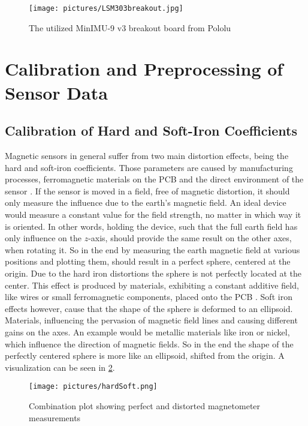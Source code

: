 \begin{figure}
\centering
\texttt{[image: pictures/LSM303breakout.jpg]}
\caption{The utilized MinIMU-9 v3 breakout board from Pololu \cite{pol2016}}
\label{fig:breakout}
\end{figure}


\section{Calibration and Preprocessing of Sensor Data} \label{sec:caliPrepro}

\subsection{Calibration of Hard and Soft-Iron Coefficients} \label{subsec:hardSoft}

Magnetic sensors in general suffer from two main distortion effects, being the hard and soft-iron coefficients. Those parameters are caused by manufacturing processes, ferromagnetic materials on the \ac{PCB} and the direct environment of the sensor \cite{ozyagcilar2012calibrating}. If the sensor is moved in a field, free of magnetic distortion, it should only measure the influence due to the earth's magnetic field. An ideal device would measure a constant value for the field strength, no matter in which way it is oriented. In other words, holding the device, such that the full earth field has only influence on the $ z $-axis, should provide the same result on the other axes, when rotating it. So in the end by measuring the earth magnetic field at various positions and plotting them, should result in a perfect sphere, centered at the origin. Due to the hard iron distortions the sphere is not perfectly located at the center. This effect is produced by materials, exhibiting a constant additive field, like wires or small ferromagnetic components, placed onto the PCB \cite{konv2009}. Soft iron effects however, cause that the shape of the sphere is deformed to an ellipsoid. Materials, influencing the pervasion of magnetic field lines and causing different gains on the axes. An example would be metallic materials like iron or nickel, which influence the direction of magnetic fields. So in the end the shape of the perfectly centered sphere is more like an ellipsoid, shifted from the origin. A visualization can be seen in \ref{fig:hardSoft}.

\begin{figure}
\centering
\texttt{[image: pictures/hardSoft.png]}
\caption{Combination plot showing perfect and distorted magnetometer measurements \cite{ozyagcilar2012calibrating}}
\label{fig:hardSoft}
\end{figure}

